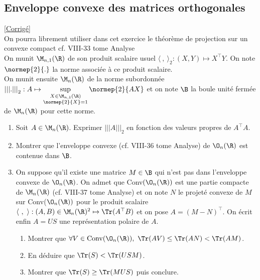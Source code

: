 \documentclass[8pt]{book}
\begin{document}
\subsection{Enveloppe convexe des matrices orthogonales }
\label{Enveloppe convexe des matrices orthogonales}
\textcolor{blue}{\hyperref[Enveloppe convexe des matrices orthogonales corrigé]{[Corrigé]}}\\
On pourra librement utiliser dans cet exercice le théorème de projection sur un convexe compact cf. VIII-33 tome Analyse\\
On munit $\M_{n,1}(\R)$ de son produit scalaire usuel $\langle\ ,\ \rangle_2:(X,Y)\mapsto X^\top Y$. On note $\normep{2}{.}$ la norme associée à ce produit scalaire.\\
On munit ensuite $\M_n(\R)$ de la norme subordonnée ${|||.|||}_2:A\mapsto\sup\limits_{\substack{X\in \M_{n,1}(\R)\\\normep {2}{X}=1}}\normep{2}{AX}$ et on note $\B$ la boule unité fermée de $\M_n(\R)$ pour cette norme.
\begin{enumerate}
	\item Soit $A\in \M_n(\R)$. Exprimer ${|||A|||}_2$ en fonction des valeurs propres de $A^\top A$.
	\item Montrer que l'enveloppe convexe (cf. VIII-36 tome Analyse) de $\O_n(\R)$ est contenue dans $\B$.
	\item On suppose qu'il existe une matrice $M\in \B$ qui n'est pas dans l'enveloppe convexe de $\O_n(\R)$. On admet que Conv$(\O_n(\R))$ est une partie compacte de $\M_n(\R)$ (cf. VIII-37 tome Analyse) et on note $N$ le projeté convexe de $M$ sur Conv($\O_n(\R))$ pour le produit scalaire $\langle\ ,\ \rangle:(A,B)\in \M_n(\R)^2\mapsto \Tr(A^\top B)$ et on pose $A=(M-N)^\top$. On écrit enfin $A=US$ une représentation polaire de $A$.
	\begin{enumerate}[label=\alph*.]
		\item Montrer que $\forall V\in \text{Conv}(\O_n(\R)),\ \Tr(AV)\leq\Tr(AN)<\Tr(AM)$.
		\item En déduire que $\Tr(S)<\Tr(USM)$.
		\item Montrer que $\Tr(S)\geq \Tr(MUS)$ puis conclure.
	\end{enumerate}
\end{enumerate}
\end{document}
